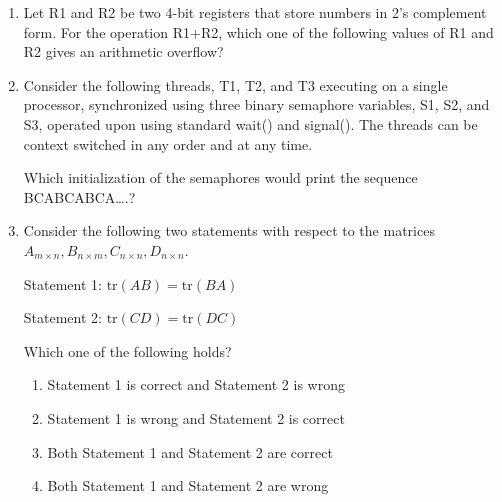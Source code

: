 \begin{enumerate}
\item Let R1 and R2 be two 4-bit registers that store numbers in 2’s complement form. For the operation R1+R2, which one of the following values of R1 and R2 gives an arithmetic overflow?  

\begin{enumerate}
\end{enumerate}

\hfill{}

\item Consider the following threads, T1, T2, and T3 executing on a single processor, synchronized using three binary semaphore variables, S1, S2, and S3, operated upon using standard wait() and signal(). The threads can be context switched in any order and at any time.  


Which initialization of the semaphores would print the sequence BCABCABCA….?  

\begin{enumerate}
\end{enumerate}

\hfill{}

\item Consider the following two statements with respect to the matrices $A_{m \times n}, B_{n \times m}, C_{n \times n}, D_{n \times n}$.  

Statement 1: $\text{tr}(AB) = \text{tr}(BA)$  

Statement 2: $\text{tr}(CD) = \text{tr}(DC)$  

Which one of the following holds?  

\begin{enumerate}
\item Statement 1 is correct and Statement 2 is wrong
\item Statement 1 is wrong and Statement 2 is correct
\item Both Statement 1 and Statement 2 are correct
\item Both Statement 1 and Statement 2 are wrong
\end{enumerate}


\end{enumerate}

